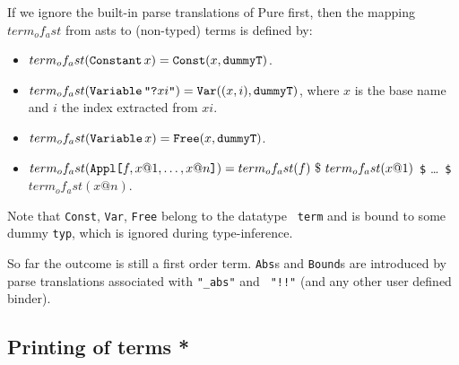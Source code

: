 If we ignore the built-in parse translations of Pure first, then the mapping
$term_of_ast$ from asts to (non-typed) terms
is defined by:
\begin{itemize}
  \item $term_of_ast(\mathop{\mbox{\tt Constant}}\nolimits x) = \mathop{\mbox{\tt Const}}\nolimits (x, \mbox{\tt dummyT})$.

  \item $term_of_ast(\mathop{\mbox{\tt Variable}}\nolimits \mbox{\tt "?}xi\mbox{\tt "}) = \mathop{\mbox{\tt Var}}\nolimits ((x, i),
    \mbox{\tt dummyT})$, where $x$ is the base name and $i$ the index extracted
    from $xi$.

  \item $term_of_ast(\mathop{\mbox{\tt Variable}}\nolimits x) = \mathop{\mbox{\tt Free}}\nolimits (x, \mbox{\tt dummyT})$.

  \item $term_of_ast(\mathop{\mbox{\tt Appl}}\nolimits\mathopen{\mbox{\tt [}}f, x@1, \ldots, x@n\mathclose{\mbox{\tt ]}}) = term_of_ast(f) ~{\tt\$}~
    term_of_ast(x@1)$ {\tt\$} \dots\ {\tt\$} $term_of_ast(x@n)$.
\end{itemize}
Note that {\tt Const}, {\tt Var}, {\tt Free} belong to the datatype {\tt
term} and  is bound to some dummy {\tt typ}, which is ignored
during type-inference.

So far the outcome is still a first order term. {\tt Abs}s and {\tt Bound}s
are introduced by parse translations associated with {\tt "_abs"} and {\tt
"!!"} (and any other user defined binder).


\subsection{Printing of terms *}

